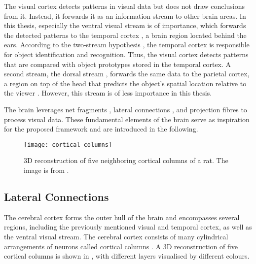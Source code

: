 The visual cortex detects patterns in visual data but does not draw conclusions from it. Instead, it forwards it as an information stream to other brain areas. In this thesis, especially the ventral visual stream  is of importance, which forwards the detected patterns to the temporal cortex , a brain region located behind the ears.
According to the two-stream hypothesis \cite{goodale_separate_1992}, the temporal cortex is responsible for object identification and recognition.
Thus, the visual cortex detects patterns that are compared with object prototypes stored in the temporal cortex.
A second stream, the dorsal stream \cite{goodale_separate_1992}, forwards the same data to the parietal cortex, a region on top of the head that predicts the object's spatial location relative to the viewer . However, this stream is of less importance in this thesis.

The brain leverages net fragments , lateral connections , and projection fibres  to process visual data. These fundamental elements of the brain serve as inspiration for the proposed framework and are introduced in the following.

\begin{figure}[h]
    \centering
    \texttt{[image: cortical\_columns]}
    \caption[3D reconstruction of five neighbouring cortical columns]{3D reconstruction of five neighboring cortical columns of a rat. The image is from .}
\end{figure}

\subsection{Lateral Connections}
The cerebral cortex forms the outer hull of the brain  and encompasses several regions, including the previously mentioned visual and temporal cortex, as well as the ventral visual stream.
The cerebral cortex consists of many cylindrical arrangements of neurons called cortical columns .
A 3D reconstruction of five cortical columns is shown in , with different layers visualised by different colours.


